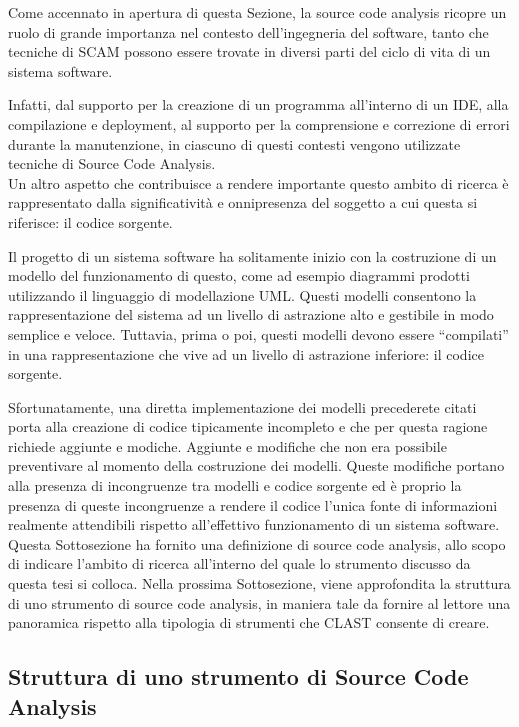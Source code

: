 Come accennato in apertura di questa Sezione, la source code analysis ricopre
un ruolo di grande importanza nel contesto dell'ingegneria del software, tanto
che tecniche di SCAM possono essere trovate in diversi parti del ciclo di vita
di un sistema software.

Infatti, dal supporto per la creazione di un programma all’interno di un IDE,
alla compilazione e deployment, al supporto per la comprensione e correzione di
errori durante la manutenzione, in ciascuno di questi contesti vengono
utilizzate tecniche di Source Code Analysis.\\

Un altro aspetto che contribuisce a rendere importante questo ambito di ricerca
è rappresentato dalla significatività e onnipresenza del soggetto a cui questa
si riferisce: il codice sorgente.

Il progetto di un sistema software ha solitamente inizio con la costruzione di
un modello del funzionamento di questo, come ad esempio diagrammi prodotti
utilizzando il linguaggio di modellazione UML. Questi modelli consentono la
rappresentazione del sistema ad un livello di astrazione alto e gestibile in
modo semplice e veloce. Tuttavia, prima o poi, questi modelli devono essere
“compilati” in una rappresentazione che vive ad un livello di astrazione
inferiore: il codice sorgente.

Sfortunatamente, una diretta implementazione dei modelli precederete citati
porta alla creazione di codice tipicamente incompleto e che per questa ragione
richiede aggiunte e modiche. Aggiunte e modifiche che non era possibile
preventivare al momento della costruzione dei modelli. Queste modifiche portano
alla presenza di incongruenze tra modelli e codice sorgente ed è proprio la
presenza di queste incongruenze a rendere il codice l’unica fonte di
informazioni realmente attendibili rispetto all’effettivo funzionamento di un
sistema software.\\

Questa Sottosezione ha fornito una definizione di source code analysis, allo
scopo di indicare l'ambito di ricerca all'interno del quale lo strumento
discusso da questa tesi si colloca. Nella prossima Sottosezione, viene
approfondita la struttura di uno strumento di source code analysis, in maniera
tale da fornire al lettore una panoramica rispetto alla tipologia di strumenti
che CLAST consente di creare.

\subsection{Struttura di uno strumento di Source Code Analysis}

